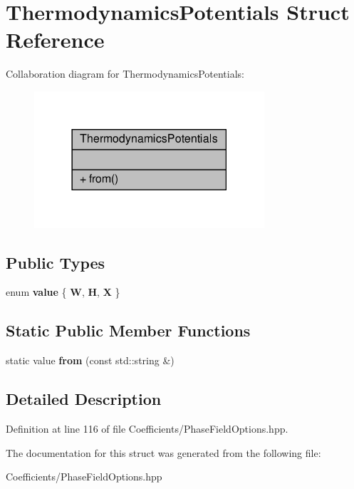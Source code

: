 \hypertarget{structThermodynamicsPotentials}{}\section{Thermodynamics\+Potentials Struct Reference}
\label{structThermodynamicsPotentials}


Collaboration diagram for Thermodynamics\+Potentials\+:\nopagebreak
\begin{figure}[H]
\begin{center}
\leavevmode
\includegraphics[width=242pt]{structThermodynamicsPotentials__coll__graph}
\end{center}
\end{figure}
\subsection*{Public Types}
\begin{DoxyCompactItemize}
\item 
\mbox{\label{structThermodynamicsPotentials_af8a8c1e41e280eaf146466957ef6c3bb}} 
enum {\bfseries value} \{ {\bfseries W}, 
{\bfseries H}, 
{\bfseries X}
 \}
\end{DoxyCompactItemize}
\subsection*{Static Public Member Functions}
\begin{DoxyCompactItemize}
\item 
\mbox{\label{structThermodynamicsPotentials_ab187b36d4e7ebb8fc917628222895fae}} 
static value {\bfseries from} (const std\+::string \&)
\end{DoxyCompactItemize}


\subsection{Detailed Description}


Definition at line 116 of file Coefficients/\+Phase\+Field\+Options.\+hpp.



The documentation for this struct was generated from the following file\+:\begin{DoxyCompactItemize}
\item 
Coefficients/\+Phase\+Field\+Options.\+hpp\end{DoxyCompactItemize}
